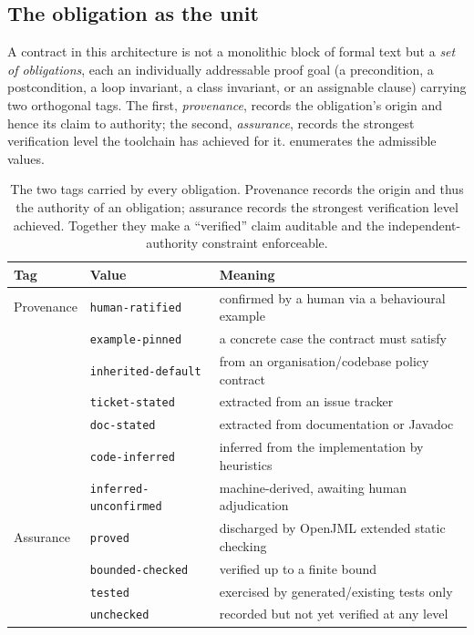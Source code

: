 \subsection{The obligation as the unit}
\label{subsec:obligation}

A contract in this architecture is not a monolithic block of formal text but a \emph{set of obligations}, each an individually addressable proof goal (a precondition, a postcondition, a loop invariant, a class invariant, or an assignable clause) carrying two orthogonal tags. The first, \emph{provenance}, records the obligation's origin and hence its claim to authority; the second, \emph{assurance}, records the strongest verification level the toolchain has achieved for it.  enumerates the admissible values.

\begin{table}[t]
  \centering
  \caption{The two tags carried by every obligation. Provenance records the origin and thus the authority of an obligation; assurance records the strongest verification level achieved. Together they make a ``verified'' claim auditable and the independent-authority constraint enforceable.}
  \label{tab:tags}
  \begin{tabular}{@{}lll@{}}
    \toprule
    Tag & Value & Meaning \\
    \midrule
    Provenance & \texttt{human-ratified}       & confirmed by a human via a behavioural example \\
               & \texttt{example-pinned}       & a concrete case the contract must satisfy \\
               & \texttt{inherited-default}    & from an organisation/codebase policy contract \\
               & \texttt{ticket-stated}        & extracted from an issue tracker \\
               & \texttt{doc-stated}           & extracted from documentation or Javadoc \\
               & \texttt{code-inferred}        & inferred from the implementation by heuristics \\
               & \texttt{inferred-unconfirmed} & machine-derived, awaiting human adjudication \\
    \midrule
    Assurance  & \texttt{proved}          & discharged by OpenJML extended static checking \\
               & \texttt{bounded-checked} & verified up to a finite bound \\
               & \texttt{tested}          & exercised by generated/existing tests only \\
               & \texttt{unchecked}       & recorded but not yet verified at any level \\
    \bottomrule
  \end{tabular}
\end{table}

